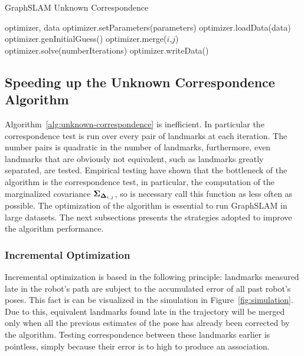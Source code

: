 \begin{algorithm}[htbp!]
    \caption{GraphSLAM Unknown Correspondence}
    \label{alg:unknown-correspondence}
    \begin{algorithmic}[1]
        \Require optimizer, data
        \State optimizer.setParameters(parameters)
        \State optimizer.loadData(data)
        \State optimizer.genInitialGuess()
        \State
                    \State optimizer.merge($i$,$j$) 
                \EndIf 
            \EndFor
            \State optimizer.solve(numberIterations)
        \EndWhile
        \State
        \State optimizer.writeData()
    \end{algorithmic}
\end{algorithm}

\subsection{Speeding up the Unknown Correspondence Algorithm}

Algorithm~\ref{alg:unknown-correspondence} is inefficient. In particular the correspondence test is run over every pair of landmarks at each iteration. The number pairs is quadratic in the number of landmarks, furthermore, even landmarks that are obviously not equivalent, such as landmarks greatly separated, are tested. Empirical testing have shown that the bottleneck of the algorithm is the correspondence test, in particular, the computation of the marginalized covariance $\boldsymbol{\Sigma}_{\boldsymbol{\Delta}_{i,j}}$, so is necessary call this function as less often as possible. The optimization of the algorithm is essential to run GraphSLAM in large datasets. The next subsections presents the strategies adopted to improve the algorithm performance.

\subsubsection{Incremental Optimization}

Incremental optimization is based in the following principle: landmarks measured late in the robot's path are subject to the accumulated error of all past robot's poses. This fact is can be visualized in the simulation in Figure~\ref{fig:simulation}. Due to this, equivalent landmarks found late in the trajectory will be merged only when all the previous estimates of the pose has already been corrected by the algorithm. Testing correspondence between these landmarks earlier is pointless, simply because their error is to high to produce an association. 

